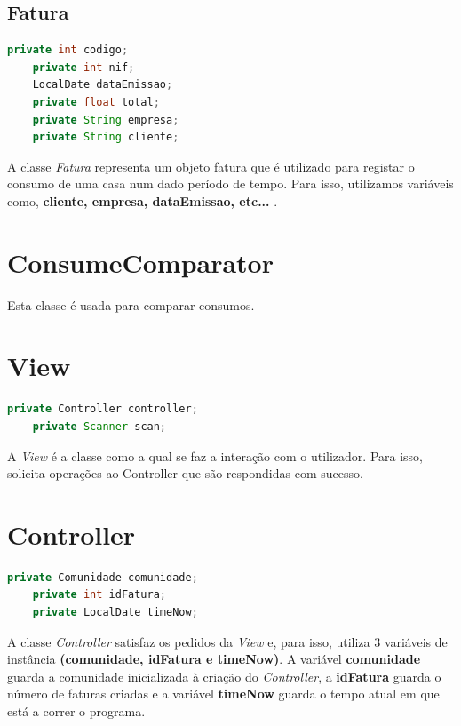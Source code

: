 \documentclass[11pt,a4paper]{report}
\begin{document}
	\subsection{Fatura}
	\begin{lstlisting}[language=java,firstnumber=1]
    private int codigo;
    private int nif;
    LocalDate dataEmissao;
    private float total;
    private String empresa;
    private String cliente;
    \end{lstlisting}
    
    A classe \textit{Fatura} representa um objeto fatura que é utilizado para registar o consumo de uma casa num dado período de tempo. Para isso, utilizamos variáveis como, \textbf{cliente, empresa, dataEmissao, etc...} .
    
    \section{ConsumeComparator}
    
    Esta classe é usada para comparar consumos.
    
    \section{View}
    \begin{lstlisting}[language=java,firstnumber=1]
    private Controller controller;
    private Scanner scan;
    \end{lstlisting}
    
    A \textit{View} é a classe como a qual se faz a interação com o utilizador. Para isso, solicita operações ao Controller que são respondidas com sucesso. 
	
	\section{Controller}
	\begin{lstlisting}[language=java,firstnumber=1]
    private Comunidade comunidade;
    private int idFatura;
    private LocalDate timeNow;
    \end{lstlisting}
    
    A classe\textit{ Controller} satisfaz os pedidos da \textit{View} e, para isso, utiliza 3 variáveis de instância \textbf{(comunidade, idFatura e timeNow)}. A variável \textbf{comunidade} guarda a comunidade inicializada à criação do \textit{Controller}, a \textbf{idFatura} guarda o número de faturas criadas e a variável \textbf{timeNow} guarda o tempo atual em que está a correr o programa.
	
\end{document}
